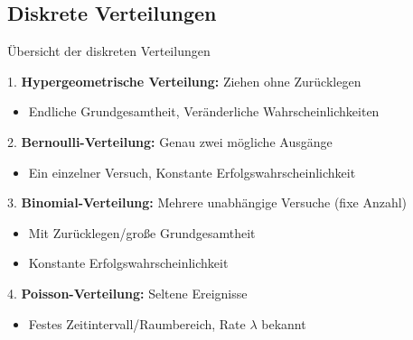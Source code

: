 
\subsection{Diskrete Verteilungen}

\begin{theorem}{Übersicht der diskreten Verteilungen}
    
1. \textbf{Hypergeometrische Verteilung:} Ziehen ohne Zurücklegen
   \begin{itemize}
   \item Endliche Grundgesamtheit, Veränderliche Wahrscheinlichkeiten
   \end{itemize}
2. \textbf{Bernoulli-Verteilung:} Genau zwei mögliche Ausgänge
   \begin{itemize}
   \item Ein einzelner Versuch, Konstante Erfolgswahrscheinlichkeit
   \end{itemize}
3. \textbf{Binomial-Verteilung:} Mehrere unabhängige Versuche (fixe Anzahl)
   \begin{itemize}
   \item Mit Zurücklegen/große Grundgesamtheit
   \item Konstante Erfolgswahrscheinlichkeit
   \end{itemize}
4. \textbf{Poisson-Verteilung:} Seltene Ereignisse
   \begin{itemize}
   \item Festes Zeitintervall/Raumbereich, Rate $\lambda$ bekannt
   \end{itemize}
\end{theorem}

